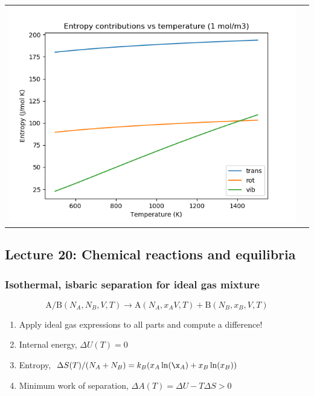 \documentclass[11pt]{article}
\begin{document}
\begin{table}
\begin{tabular}{cc}
\includegraphics[scale=0.5]{./Images/ethane-entropy.png}
\end{tabular}
\end{table}

\subsection{Lecture 20: Chemical reactions and equilibria}
\label{sec:org1af6a64}
\subsubsection{Isothermal, isbaric separation for ideal gas mixture}
\label{sec:orgc421369}
\[ \text{A/B} (N_{A},N_{B},V,T) \rightarrow \text{A}(N_{A},x_{A}V,T) + \text{B}(N_{B},x_{B},V,T) \]
\begin{enumerate}
\item Apply ideal gas expressions to all parts and compute a difference!
\item Internal energy, \(\Delta U(T) = 0\)
\item Entropy, \(\Delta S(T)/(N_A+N_B) = k_B(x_A\ln(\x_A) + x_B \ln(x_B))\)
\item Minimum work of separation, \(\Delta A(T) = \Delta U - T\Delta S > 0\)
\end{enumerate}
\end{document}
